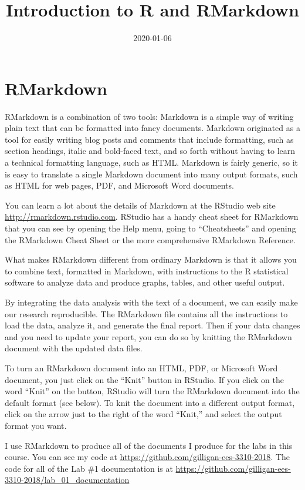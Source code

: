 \documentclass[
]{article}
\title{Introduction to R and RMarkdown}
\author{}
\date{\vspace{-2.5em}2020-01-06}
\begin{document}
\maketitle

{
\setcounter{tocdepth}{2}
\tableofcontents
}
\hypertarget{rmarkdown}{%
\section{RMarkdown}\label{rmarkdown}}

RMarkdown is a combination of two tools: Markdown is a simple way of
writing plain text that can be formatted into fancy documents. Markdown
originated as a tool for easily writing blog posts and comments that
include formatting, such as section headings, italic and bold-faced
text, and so forth without having to learn a technical formatting
language, such as HTML. Markdown is fairly generic, so it is easy to
translate a single Markdown document into many output formats, such as
HTML for web pages, PDF, and Microsoft Word documents.

You can learn a lot about the details of Markdown at the RStudio web
site \url{http://rmarkdown.rstudio.com}. RStudio has a handy cheat sheet
for RMarkdown that you can see by opening the Help menu, going to
``Cheatsheets'' and opening the RMarkdown Cheat Sheet or the more
comprehensive RMarkdown Reference.

What makes RMarkdown different from ordinary Markdown is that it allows
you to combine text, formatted in Markdown, with instructions to the R
statistical software to analyze data and produce graphs, tables, and
other useful output.

By integrating the data analysis with the text of a document, we can
easily make our research reproducible. The RMarkdown file contains all
the instructions to load the data, analyze it, and generate the final
report. Then if your data changes and you need to update your report,
you can do so by knitting the RMarkdown document with the updated data
files.

To turn an RMarkdown document into an HTML, PDF, or Microsoft Word
document, you just click on the ``Knit'' button in RStudio. If you click
on the word ``Knit'' on the button, RStudio will turn the RMarkdown
document into the default format (see below). To knit the document into
a different output format, click on the arrow just to the right of the
word ``Knit,'' and select the output format you want.

I use RMarkdown to produce all of the documents I produce for the labs
in this course. You can see my code at
\url{https://github.com/gilligan-ees-3310-2018}. The code for all of the
Lab \#1 documentation is at
\url{https://github.com/gilligan-ees-3310-2018/lab_01_documentation}
\end{document}
